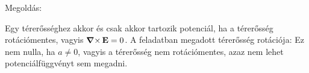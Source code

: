 
\ifdefined\megoldas
  
 Megoldás: 

 Egy térerősséghez akkor és csak akkor tartozik potenciál, ha a térerősség rotációmentes, vagyis $\mathop{\boldsymbol{\nabla}\times}\nolimits\mathbf{E}=0$. A feladatban megadott térerősség rotációja:
 Ez nem nulla, ha $a\neq 0$, vagyis a térerősség nem rotációmentes, azaz nem lehet potenciálfüggvényt sem megadni. 

\fi